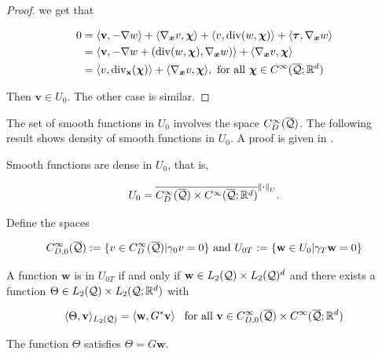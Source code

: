 \begin{proof}
    we get that

    \begin{align*}
      0&=\langle \mathbf{v} , -\nabla w \rangle+\langle \nabla_{\boldsymbol{x}} v , \boldsymbol{\chi} \rangle+\langle v , \operatorname{div}(w,\boldsymbol{\chi}) \rangle+\langle \boldsymbol{\tau} , \nabla_{\boldsymbol{x}} w \rangle\\&=\langle \mathbf{v} , -\nabla w+(\operatorname{div}(w,\boldsymbol{\chi}),\nabla_{\boldsymbol{x}} w) \rangle+\langle \nabla_{\boldsymbol{x}} v , \boldsymbol{\chi} \rangle\\&=\langle v , \operatorname{div}_{\mathbf{x}}(\boldsymbol{\chi}) \rangle+\langle \nabla_{\boldsymbol{x}} v , \boldsymbol{\chi} \rangle, \text{ for all }\boldsymbol{\chi}\in C^\infty(\overline{\mathcal{Q}};\mathbb{R}^d)  
    \end{align*}

    Then $\mathbf{v}\in U_0$. The other case is similar.

    
   
\end{proof}

The set of smooth functions in $U_0$ involves the space $C_D^\infty(\overline{\mathcal{Q}})$. The following result shows density of smooth functions in $U_0$. A proof is given in \cite[Lemma 6]{diening2022space}.

\begin{lemma}\label{Dense}
    Smooth functions are dense in $U_0$, that is,

    $$U_0=\overline{C_D^\infty(\overline{\mathcal{Q}})\times C^\infty(\overline{\mathcal{Q}};\mathbb{R}^d)}^{\left\lVert\boldsymbol{\cdot} \right\rVert_U}.$$
\end{lemma}

Define the spaces 

$$C_{D,0}^\infty(\overline{\mathcal{Q}}):=\{v\in C_D^\infty(\overline{\mathcal{Q}})|\gamma_0 v=0\}\text{ and }U_{0T}:=\{\mathbf{w}\in U_0|\gamma_T\mathbf{w}=0\}$$


\begin{lemma}\label{ChacU0T}
    A function $\mathbf{w}$ is in $U_{0T}$ if and only if $\mathbf{w}\in L_2(\mathcal{Q})\times L_2(\mathcal{Q})^d$ and there exists a function $\Theta\in L_2(\mathcal{Q})\times L_2(\mathcal{Q};\mathbb{R}^d)$ with

    \begin{equation}\label{chU0T}
        \langle \Theta , \mathbf{v} \rangle_{L_2(\mathcal{Q})}=\langle \mathbf{w} , G^*\mathbf{v} \rangle\hspace{0.3 cm}\text{for all }\mathbf{v}\in C_{D,0}^\infty(\overline{\mathcal{Q}})\times C^\infty(\overline{\mathcal{Q}};\mathbb{R}^d)
    \end{equation}

    The function $\Theta$ satisfies $\Theta=G\mathbf{w}$.
\end{lemma}

